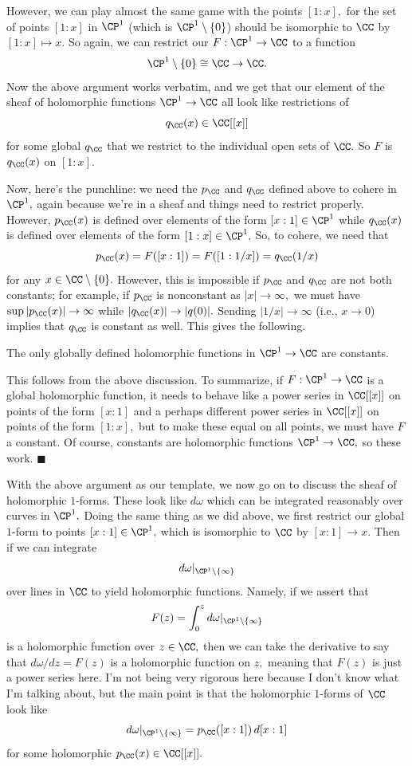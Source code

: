However, we can play almost the same game with the points $[1:x],$ for the set of points $[1:x]$ in $\CP^1$ (which is $\CP^1\setminus\{0\}$) should be isomorphic to $\CC$ by $[1:x]\mapsto x.$ So again, we can restrict our $F:\CP^1\to\CC$ to a function
\[\CP^1\setminus\{0\}\cong\CC\to\CC.\]
Now the above argument works verbatim, and we get that our element of the sheaf of holomorphic functions $\CP^1\to\CC$ all look like restrictions of
\[q_\CC(x)\in\CC[[x]]\]
for some global $q_\CC$ that we restrict to the individual open sets of $\CC.$ So $F$ is $q_\CC(x)$ on $[1:x].$

Now, here's the punchline: we need the $p_\CC$ and $q_\CC$ defined above to cohere in $\CP^1,$ again because we're in a sheaf and things need to restrict properly. However, $p_\CC(x)$ is defined over elements of the form $[x:1]\in\CP^1$ while $q_\CC(x)$ is defined over elements of the form $[1:x]\in\CP^1.$ So, to cohere, we need that
\[p_\CC(x)=F([x:1])=F([1:1/x])=q_\CC(1/x)\]
for any $x\in\CC\setminus\{0\}.$ However, this is impossible if $p_\CC$ and $q_\CC$ are not both constants; for example, if $p_\CC$ is nonconstant as $|x|\to\infty,$ we must have $\sup|p_\CC(x)|\to\infty$ while $|q_\CC(x)|\to|q(0)|.$ Sending $|1/x|\to\infty$ (i.e., $x\to0$) implies that $q_\CC$ is constant as well. This gives the following.
\begin{proposition}
    The only globally defined holomorphic functions in $\CP^1\to\CC$ are constants.
\end{proposition}
This follows from the above discussion. To summarize, if $F:\CP^1\to\CC$ is a global holomorphic function, it needs to behave like a power series in $\CC[[x]]$ on points of the form $[x:1]$ and a perhaps different power series in $\CC[[x]]$ on points of the form $[1:x],$ but to make these equal on all points, we must have $F$ a constant. Of course, constants are holomorphic functions $\CP^1\to\CC,$ so these work. $\blacksquare$

With the above argument as our template, we now go on to discuss the sheaf of holomorphic $1$-forms. These look like $d\omega$ which can be integrated reasonably over curves in $\CP^1.$ Doing the same thing as we did above, we first restrict our global $1$-form to points $[x:1]\in\CP^1,$ which is isomorphic to $\CC$ by $[x:1]\to x.$ Then if we can integrate
\[d\omega|_{\CP^1\setminus\{\infty\}}\]
over lines in $\CC$ to yield holomorphic functions. Namely, if we assert that
\[F(z)=\int_0^zd\omega|_{\CP^1\setminus\{\infty\}}\]
is a holomorphic function over $z\in\CC,$ then we can take the derivative to say that $d\omega/dz=F(z)$ is a holomorphic function on $z,$ meaning that $F(z)$ is just a power series here. I'm not being very rigorous here because I don't know what I'm talking about, but the main point is that the holomorphic $1$-forms of $\CC$ look like
\[d\omega|_{\CP^1\setminus\{\infty\}}=p_\CC([x:1])\,d[x:1]\]
for some holomorphic $p_\CC(x)\in\CC[[x]].$


